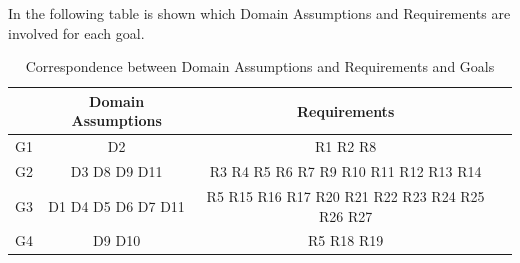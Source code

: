 \documentclass[a4paper]{report}
\begin{document}
In the following table is shown which Domain Assumptions and Requirements are involved for each goal.
\begin{table}[H]  
  \centering
  \begin{tabular}{|c|c|c|c|}
    \cline{2-3}
    \multicolumn{1}{c|}{} & Domain Assumptions  & Requirements \\ \hline
    G1 & D2 & R1 R2 R8\\ \hline
    G2 & D3 D8 D9 D11 & R3 R4 R5 R6 R7 R9 R10 R11 R12 R13 R14\\ \hline
    G3 & D1 D4 D5 D6 D7 D11 & R5 R15 R16 R17 R20 R21 R22 R23 R24 R25 R26 R27\\ \hline
    G4 & D9 D10 & R5 R18 R19 \\ \hline
  \end{tabular}
  \caption{Correspondence between Domain Assumptions and Requirements and Goals}
\end{table}
\end{document}
